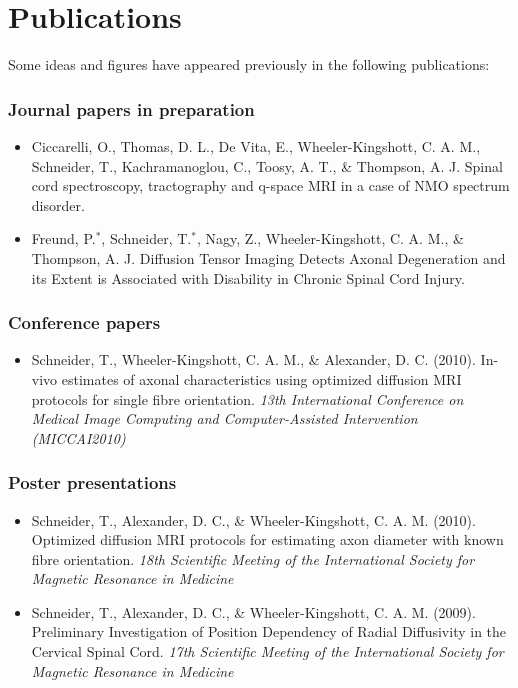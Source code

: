 

\chapter*{Publications} %

Some ideas and figures have appeared previously in the following publications:

\bigskip

\subsection*{Journal papers in preparation}
\begin{itemize}
 \item Ciccarelli, O., Thomas, D. L., De Vita, E., Wheeler-Kingshott, C. A. M., Schneider, T., Kachramanoglou, C., Toosy, A. T., \& Thompson, A. J. Spinal cord spectroscopy, tractography and q-space MRI in a case of NMO spectrum disorder.
 \item Freund, P.$^*$, Schneider, T.$^*$, Nagy, Z., Wheeler-Kingshott, C. A. M., \& Thompson, A. J. Diffusion Tensor Imaging Detects Axonal Degeneration and its Extent is Associated with Disability in Chronic Spinal Cord Injury.  
\end{itemize}
\subsection*{Conference papers}
\begin{itemize}
 \item Schneider, T., Wheeler-Kingshott, C. A. M., \& Alexander, D. C. (2010). In-vivo estimates of axonal characteristics using optimized diffusion MRI protocols for single fibre orientation. \emph{13th International Conference on Medical Image Computing and Computer-Assisted Intervention (MICCAI2010)}  
\end{itemize}
\subsection*{Poster presentations}
\begin{itemize}
 \item Schneider, T., Alexander, D. C., \& Wheeler-Kingshott, C. A. M. (2010). Optimized diffusion MRI protocols for estimating axon diameter with known fibre orientation. \emph{18th Scientific Meeting of the International Society for Magnetic Resonance in Medicine}
 \item Schneider, T., Alexander, D. C., \& Wheeler-Kingshott, C. A. M. (2009). Preliminary Investigation of Position Dependency of Radial Diffusivity in the Cervical Spinal Cord. \emph{17th Scientific Meeting of the International Society for Magnetic Resonance in Medicine}  
\end{itemize}

